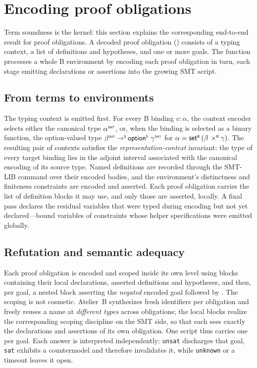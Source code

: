 \section{Encoding proof obligations}
\label{sec:beer-proof-obligations}

Term soundness is the kernel: this section explains the corresponding end-to-end result for proof obligations.
A decoded proof obligation () consists of a typing context, a list of definitions and hypotheses, and one or more goals.
The {\small{}} function processes a whole B environment by encoding each proof obligation in turn, each stage emitting declarations or assertions into the growing SMT script.

\subsection{From terms to environments}
\label{sec:beer-po-environments}

The typing context is emitted first.
For every B binding \(v:\alpha\), the context encoder selects either the canonical type \(\toSMT{\alpha}\), or, when the binding is selected as a binary function, the option-valued type \(\toSMT{\beta}\toS\optS\,\toSMT{\gamma}\) for \(\alpha=\mathsf{set}^{\scriptscriptstyle{\mathsf{B}}}\,(\beta\mathbin{\,\times^{\scriptscriptstyle{\mathsf{B}}}}\gamma)\).
The resulting pair of contexts satisfies the \emph{representation-context} invariant: the type of every target binding lies in the adjoint interval associated with the canonical encoding of its source type.
Named definitions are recorded through the SMT-LIB command  over their encoded bodies, and the environment's distinctness and finiteness constraints are encoded and asserted.
Each proof obligation carries the list of definition blocks it may use, and only those are asserted, locally.
A final pass declares the residual variables that were typed during encoding but not yet declared---bound variables of constraints whose helper specifications were emitted globally.

\subsection{Refutation and semantic adequacy}
\label{sec:beer-po-refutation}
\label{sec:beer-po-soundness}

Each proof obligation is encoded and scoped inside its own level using  blocks containing their local declarations, asserted definitions and hypotheses, and then, per goal, a nested block asserting the \emph{negated} encoded goal followed by .
The scoping is not cosmetic.
Atelier~B synthesizes fresh identifiers per obligation and freely reuses a name at \emph{different types} across obligations; the local blocks realize the corresponding scoping discipline on the SMT side, so that each  sees exactly the declarations and assertions of its own obligation.
One script thus carries one  per goal.
Each answer is interpreted independently: \texttt{unsat} discharges that goal, \texttt{sat} exhibits a countermodel and therefore invalidates it, while \texttt{unknown} or a timeout leaves it open.

